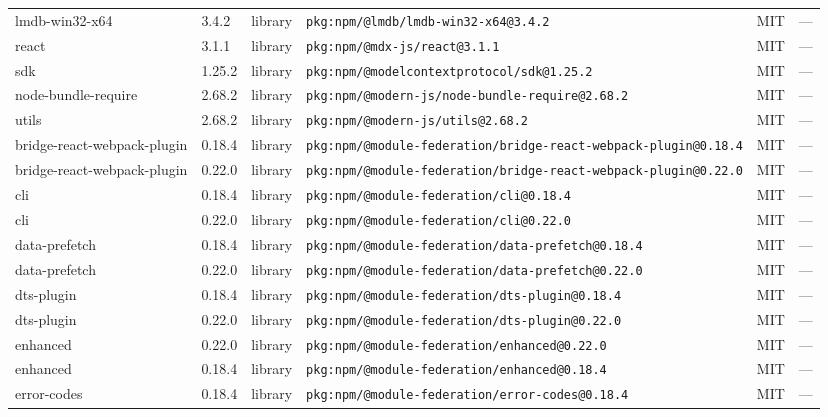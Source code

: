 \documentclass[11pt,a4paper]{article}
\begin{document}
\begin{longtable}{|p{4cm}|p{2cm}|p{1.6cm}|p{5cm}|p{1.5cm}|p{3.5cm}|}
\raggedright lmdb-win32-x64 & 3.4.2 & library & \small\texttt{pkg:npm/@lmdb/lmdb-win32-x64@3.4.2} & MIT & \small — \\
\raggedright react & 3.1.1 & library & \small\texttt{pkg:npm/@mdx-js/react@3.1.1} & MIT & \small — \\
\raggedright sdk & 1.25.2 & library & \small\texttt{pkg:npm/@modelcontextprotocol/sdk@1.25.2} & MIT & \small — \\
\raggedright node-bundle-require & 2.68.2 & library & \small\texttt{pkg:npm/@modern-js/node-bundle-require@2.68.2} & MIT & \small — \\
\raggedright utils & 2.68.2 & library & \small\texttt{pkg:npm/@modern-js/utils@2.68.2} & MIT & \small — \\
\raggedright bridge-react-webpack-plugin & 0.18.4 & library & \small\texttt{pkg:npm/@module-federation/bridge-react-webpack-plugin@0.18.4} & MIT & \small — \\
\raggedright bridge-react-webpack-plugin & 0.22.0 & library & \small\texttt{pkg:npm/@module-federation/bridge-react-webpack-plugin@0.22.0} & MIT & \small — \\
\raggedright cli & 0.18.4 & library & \small\texttt{pkg:npm/@module-federation/cli@0.18.4} & MIT & \small — \\
\raggedright cli & 0.22.0 & library & \small\texttt{pkg:npm/@module-federation/cli@0.22.0} & MIT & \small — \\
\raggedright data-prefetch & 0.18.4 & library & \small\texttt{pkg:npm/@module-federation/data-prefetch@0.18.4} & MIT & \small — \\
\raggedright data-prefetch & 0.22.0 & library & \small\texttt{pkg:npm/@module-federation/data-prefetch@0.22.0} & MIT & \small — \\
\raggedright dts-plugin & 0.18.4 & library & \small\texttt{pkg:npm/@module-federation/dts-plugin@0.18.4} & MIT & \small — \\
\raggedright dts-plugin & 0.22.0 & library & \small\texttt{pkg:npm/@module-federation/dts-plugin@0.22.0} & MIT & \small — \\
\raggedright enhanced & 0.22.0 & library & \small\texttt{pkg:npm/@module-federation/enhanced@0.22.0} & MIT & \small — \\
\raggedright enhanced & 0.18.4 & library & \small\texttt{pkg:npm/@module-federation/enhanced@0.18.4} & MIT & \small — \\
\raggedright error-codes & 0.18.4 & library & \small\texttt{pkg:npm/@module-federation/error-codes@0.18.4} & MIT & \small — \\

\end{longtable}
\end{document}
